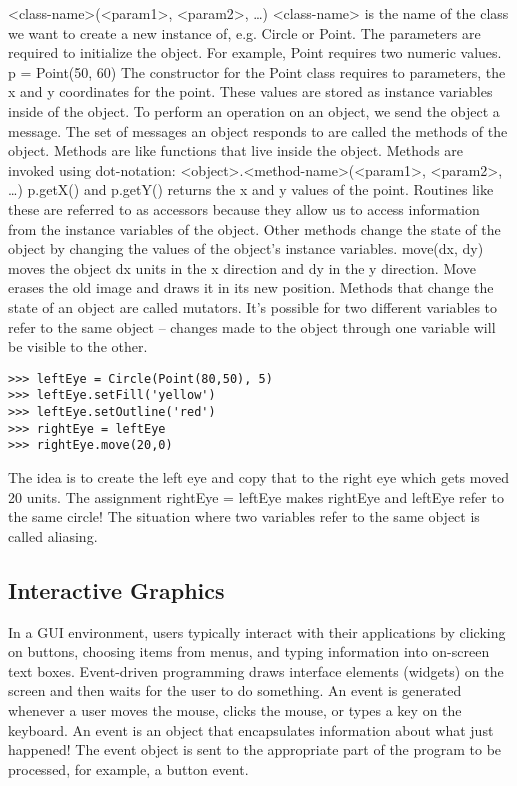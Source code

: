 \documentclass[12pt,a4paper,final,twoside,onecolumn,titlepage]{book}
\begin{document}
<class-name>(<param1>, <param2>, …)
<class-name> is the name of the class we want to create a new instance of, e.g. Circle or Point.
The parameters are required to initialize the object. For example, Point requires two numeric values.
p = Point(50, 60)
The constructor for the Point class requires to parameters, the x and y coordinates for the point.
These values are stored as instance variables inside of the object.
To perform an operation on an object, we send the object a message. The set of messages an object responds to are called the methods of the object. Methods are like functions that live inside the object.
Methods are invoked using dot-notation:
<object>.<method-name>(<param1>, <param2>, …)
p.getX() and p.getY() returns the x and y values of the point. Routines like these are referred to as accessors because they allow us to access information from the instance variables of the object.
Other methods change the state of the object by changing the values of the object’s instance variables.
move(dx, dy) moves the object dx units in the x direction and dy in the y direction.
Move erases the old image and draws it in its new position. Methods that change the state of an object are called mutators.
It’s possible for two different variables to refer to the same object – changes made to the object through one variable will be visible to the other.
\begin{lstlisting}
>>> leftEye = Circle(Point(80,50), 5)
>>> leftEye.setFill('yellow')
>>> leftEye.setOutline('red')
>>> rightEye = leftEye
>>> rightEye.move(20,0)
\end{lstlisting}
The idea is to create the left eye and copy that to the right eye which gets moved 20 units. The assignment rightEye = leftEye makes rightEye and leftEye refer to the same circle! The situation where two variables refer to the same object is called aliasing.

\subsection {Interactive Graphics}
In a GUI environment, users typically interact with their applications by clicking on buttons, choosing items from menus, and typing information into on-screen text boxes.
Event-driven programming draws interface elements (widgets) on the screen and then waits for the user to do something. An event is generated whenever a user moves the mouse, clicks the mouse, or types a key on the keyboard.
An event is an object that encapsulates information about what just happened! The event object is sent to the appropriate part of the program to be processed, for example, a button event.
\end{document}

